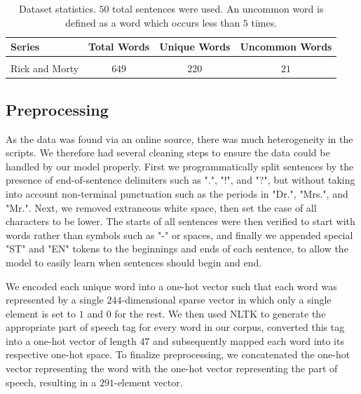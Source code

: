 \documentclass[conference]{IEEEtran}
\begin{document}
\begin{table}[!htbp]
\caption{Dataset statistics. $50$ total sentences were used. An uncommon word is defined as a word which occurs less than $5$ times.}
\label{tab:data}
\begin{center}
\begin{tabular}{lccc}

Series & Total Words & Unique Words & Uncommon Words\\
\hline{}\\
Rick and Morty & $649$ & $220$ & $21$\\

\end{tabular}
\end{center}
\vspace{-1em}
\end{table}

\subsection{Preprocessing}

As the data was found via an online source, there was much heterogeneity in the scripts.  We therefore had several cleaning steps to ensure the data could be handled by our model properly.  First we programmatically split sentences by the presence of end-of-sentence delimiters such as ".", "!", and "?", but without taking into account non-terminal punctuation such as the periods in "Dr.", "Mrs.", and "Mr.".  Next, we removed extraneous white space, then set the case of all characters to be lower.  The starts of all sentences were then verified to start with words rather than symbols such as "-" or spaces, and finally we appended special "ST" and "EN" tokens to the beginnings and ends of each sentence, to allow the model to easily learn when sentences should begin and end.

We encoded each unique word into a one-hot vector such that each word was represented by a single $244$-dimensional sparse vector in which only a single element is set to $1$ and $0$ for the rest.  We then used NLTK \cite{bird2004nltk} to generate the appropriate part of speech tag for every word in our corpus, converted this tag into a one-hot vector of length $47$ and subsequently mapped each word into its respective one-hot space.  To finalize preprocessing, we concatenated the one-hot vector representing the word with the one-hot vector representing the part of speech, resulting in a $291$-element vector.
\end{document}
